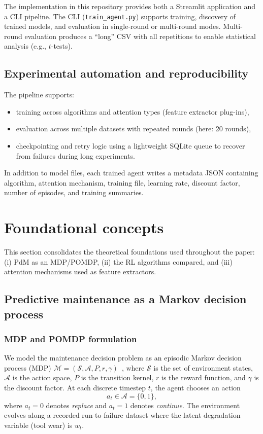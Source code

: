\documentclass[11pt]{article}
\begin{document}
The implementation in this repository provides both a Streamlit application and a CLI pipeline. The CLI (\texttt{train\_agent.py}) supports training, discovery of trained models, and evaluation in single-round or multi-round modes. Multi-round evaluation produces a ``long'' CSV with all repetitions to enable statistical analysis (e.g., $t$-tests).

\subsection{Experimental automation and reproducibility}
The pipeline supports:
\begin{itemize}
  \item training across algorithms and attention types (feature extractor plug-ins),
  \item evaluation across multiple datasets with repeated rounds (here: 20 rounds),
  \item checkpointing and retry logic using a lightweight SQLite queue to recover from failures during long experiments.
\end{itemize}

In addition to model files, each trained agent writes a metadata JSON containing algorithm, attention mechanism, training file, learning rate, discount factor, number of episodes, and training summaries.

\section{Foundational concepts}
\label{sec:foundations}
This section consolidates the theoretical foundations used throughout the paper: (i) PdM as an MDP/POMDP, (ii) the RL algorithms compared, and (iii) attention mechanisms used as feature extractors.

\subsection{Predictive maintenance as a Markov decision process}
\subsubsection{MDP and POMDP formulation}
We model the maintenance decision problem as an episodic Markov decision process (MDP) $\mathcal{M}=(\mathcal{S},\mathcal{A},P,r,\gamma)$~\cite{SuttonBarto2018}, where $\mathcal{S}$ is the set of environment states, $\mathcal{A}$ is the action space, $P$ is the transition kernel, $r$ is the reward function, and $\gamma$ is the discount factor. At each discrete timestep $t$, the agent chooses an action
\begin{equation}
  a_t \in \mathcal{A}=\{0,1\},
\end{equation}
where $a_t=0$ denotes \emph{replace} and $a_t=1$ denotes \emph{continue}. The environment evolves along a recorded run-to-failure dataset where the latent degradation variable (tool wear) is $w_t$.
\end{document}
